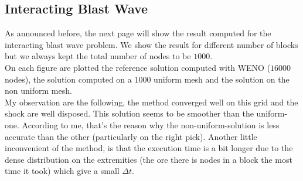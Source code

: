 \subsection{Interacting Blast Wave}
As announced before, the next page will show the result computed for the interacting blast wave problem. We show the result for different number of blocks but we always kept the total number of nodes to be $1000$.\\
On each figure are plotted the reference solution computed with WENO ($16000$ nodes), the solution computed on a $1000$ uniform mesh and the solution on the non uniform mesh.\\
\newline
My observation are the following, the method converged well on this grid and the shock are well disposed. This solution seems to be smoother than the uniform-one. According to me, that's the reason why the non-uniform-solution is less accurate than the other (particularly on the right pick). 
Another little inconvenient of the method, is that the execution time is a bit longer due to the dense distribution on the extremities (the ore there is nodes in a block the most time it took) which give a small $\Delta t$.


